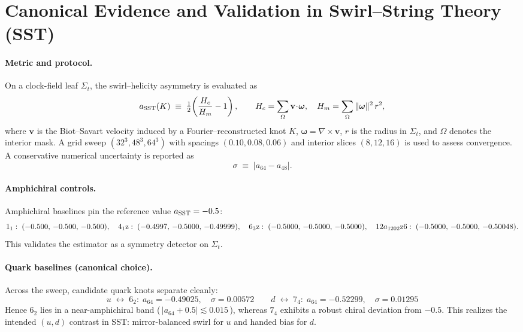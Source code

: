 \section{Canonical Evidence and Validation in Swirl--String Theory (SST)}
\label{sec:canon-validation}

\paragraph{Metric and protocol.}
On a clock-field leaf $\Sigma_t$, the swirl–helicity asymmetry is evaluated as
\[
 a_{\rm SST}(K)\;\equiv\;\tfrac12\!\left(\frac{H_c}{H_m}-1\right),\qquad
 H_c=\sum_{\Omega}\mathbf v\!\cdot\!\boldsymbol\omega,\quad
 H_m=\sum_{\Omega}\|\boldsymbol\omega\|^2\, r^2,
\]
where $\mathbf v$ is the Biot--Savart velocity induced by a Fourier–reconstructed knot $K$, $\boldsymbol\omega=\nabla\times\mathbf v$, $r$ is the radius in $\Sigma_t$, and $\Omega$ denotes the interior mask. A grid sweep $(32^3,48^3,64^3)$ with spacings $(0.10,0.08,0.06)$ and interior slices $(8,12,16)$ is used to assess convergence. A conservative numerical uncertainty is reported as
\[
 \sigma\;\equiv\;|a_{64}-a_{48}|.
\]

\paragraph{Amphichiral controls.}
Amphichiral baselines pin the reference value $a_{\rm SST}=-0.5$:
\[
 1_1:\;(-0.500,\,-0.500,\,-0.500),\quad
 4_1{\rm z}:\;(-0.4997,\,-0.5000,\,-0.49999),\quad
 6_3{\rm z}:\;(-0.5000,\,-0.5000,\,-0.5000),\quad
    12a_{1202}{\rm z6}:\;(-0.5000,\,-0.5000,\,-0.50048).
\]
This validates the estimator as a symmetry detector on $\Sigma_t$.

\paragraph{Quark baselines (canonical choice).}
Across the sweep, candidate quark knots separate cleanly:
\[
    \boxed{u\;\leftrightarrow\;6_2:\;
    a_{64}=-0.49025,\quad \sigma=0.00572}
    \qquad
    \boxed{d\;\leftrightarrow\;7_4:\;
    a_{64}=-0.52299,\quad \sigma=0.01295}
\]
Hence $6_2$ lies in a near-amphichiral band (\,$|a_{64}+0.5|\!\lesssim\!0.015$\,), whereas $7_4$ exhibits a robust chiral deviation from $-0.5$. This realizes the intended $(u,d)$ contrast in SST: mirror-balanced swirl for $u$ and handed bias for $d$.


